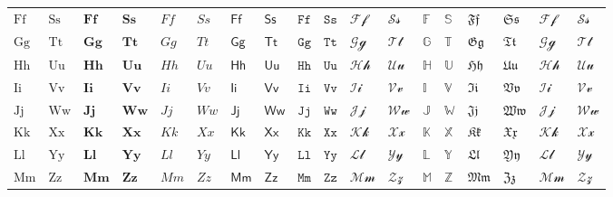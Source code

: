 \begin{table*}[htp]
{\begin{tabular}{*{18}{l}}
                $\mathrm{Ff}$ & $\mathrm{Ss}$ & $\mathbf{Ff}$ & $\mathbf{Ss}$ & $\mathit{Ff}$ & $\mathit{Ss}$ & $\mathsf{Ff}$ & $\mathsf{Ss}$ & $\mathtt{Ff}$ & $\mathtt{Ss}$ & $\mathcal{Ff}$ & $\mathcal{Ss}$ & $\mathbb{F}$ & $\mathbb{S}$ & $\mathfrak{Ff}$ & $\mathfrak{Ss}$ & $\mathscr{Ff}$ & $\mathscr{Ss}$ \\
                $\mathrm{Gg}$ & $\mathrm{Tt}$ & $\mathbf{Gg}$ & $\mathbf{Tt}$ & $\mathit{Gg}$ & $\mathit{Tt}$ & $\mathsf{Gg}$ & $\mathsf{Tt}$ & $\mathtt{Gg}$ & $\mathtt{Tt}$ & $\mathcal{Gg}$ & $\mathcal{Tt}$ & $\mathbb{G}$ & $\mathbb{T}$ & $\mathfrak{Gg}$ & $\mathfrak{Tt}$ & $\mathscr{Gg}$ & $\mathscr{Tt}$ \\
                $\mathrm{Hh}$ & $\mathrm{Uu}$ & $\mathbf{Hh}$ & $\mathbf{Uu}$ & $\mathit{Hh}$ & $\mathit{Uu}$ & $\mathsf{Hh}$ & $\mathsf{Uu}$ & $\mathtt{Hh}$ & $\mathtt{Uu}$ & $\mathcal{Hh}$ & $\mathcal{Uu}$ & $\mathbb{H}$ & $\mathbb{U}$ & $\mathfrak{Hh}$ & $\mathfrak{Uu}$ & $\mathscr{Hh}$ & $\mathscr{Uu}$ \\
                $\mathrm{Ii}$ & $\mathrm{Vv}$ & $\mathbf{Ii}$ & $\mathbf{Vv}$ & $\mathit{Ii}$ & $\mathit{Vv}$ & $\mathsf{Ii}$ & $\mathsf{Vv}$ & $\mathtt{Ii}$ & $\mathtt{Vv}$ & $\mathcal{Ii}$ & $\mathcal{Vv}$ & $\mathbb{I}$ & $\mathbb{V}$ & $\mathfrak{Ii}$ & $\mathfrak{Vv}$ & $\mathscr{Ii}$ & $\mathscr{Vv}$ \\
                $\mathrm{Jj}$ & $\mathrm{Ww}$ & $\mathbf{Jj}$ & $\mathbf{Ww}$ & $\mathit{Jj}$ & $\mathit{Ww}$ & $\mathsf{Jj}$ & $\mathsf{Ww}$ & $\mathtt{Jj}$ & $\mathtt{Ww}$ & $\mathcal{Jj}$ & $\mathcal{Ww}$ & $\mathbb{J}$ & $\mathbb{W}$ & $\mathfrak{Jj}$ & $\mathfrak{Ww}$ & $\mathscr{Jj}$ & $\mathscr{Ww}$ \\
                $\mathrm{Kk}$ & $\mathrm{Xx}$ & $\mathbf{Kk}$ & $\mathbf{Xx}$ & $\mathit{Kk}$ & $\mathit{Xx}$ & $\mathsf{Kk}$ & $\mathsf{Xx}$ & $\mathtt{Kk}$ & $\mathtt{Xx}$ & $\mathcal{Kk}$ & $\mathcal{Xx}$ & $\mathbb{K}$ & $\mathbb{X}$ & $\mathfrak{Kk}$ & $\mathfrak{Xx}$ & $\mathscr{Kk}$ & $\mathscr{Xx}$ \\
                $\mathrm{Ll}$ & $\mathrm{Yy}$ & $\mathbf{Ll}$ & $\mathbf{Yy}$ & $\mathit{Ll}$ & $\mathit{Yy}$ & $\mathsf{Ll}$ & $\mathsf{Yy}$ & $\mathtt{Ll}$ & $\mathtt{Yy}$ & $\mathcal{Ll}$ & $\mathcal{Yy}$ & $\mathbb{L}$ & $\mathbb{Y}$ & $\mathfrak{Ll}$ & $\mathfrak{Yy}$ & $\mathscr{Ll}$ & $\mathscr{Yy}$ \\
                $\mathrm{Mm}$ & $\mathrm{Zz}$ & $\mathbf{Mm}$ & $\mathbf{Zz}$ & $\mathit{Mm}$ & $\mathit{Zz}$ & $\mathsf{Mm}$ & $\mathsf{Zz}$ & $\mathtt{Mm}$ & $\mathtt{Zz}$ & $\mathcal{Mm}$ & $\mathcal{Zz}$ & $\mathbb{M}$ & $\mathbb{Z}$ & $\mathfrak{Mm}$ & $\mathfrak{Zz}$ & $\mathscr{Mm}$ & $\mathscr{Zz}$ \\
                \bottomrule
            \end{tabular}
        }
    \end{table*}
